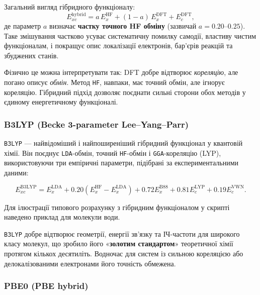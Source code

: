 Загальний вигляд гібридного функціоналу:
\begin{equation}
E_{xc}^{\text{hybrid}} = a\,E_x^{\text{HF}} + (1 - a)\,E_x^{\text{DFT}} + E_c^{\text{DFT}},
\end{equation}
де параметр $a$ визначає \textbf{частку точного HF обміну} (зазвичай $a = 0.20\text{--}0.25$).
Таке змішування частково усуває систематичну помилку самодії, властиву чистим функціоналам, і покращує опис локалізації електронів, бар’єрів реакцій та збуджених станів.

\bigskip
\noindent
Фізично це можна інтерпретувати так:
DFT добре відтворює \emph{кореляцію}, але погано описує \emph{обмін}.
Метод \texttt{HF}, навпаки, має точний обмін, але ігнорує кореляцію.
Гібридний підхід дозволяє поєднати сильні сторони обох методів у єдиному енергетичному функціоналі.

\subsubsection{B3LYP (Becke 3-parameter Lee–Yang–Parr)}

\texttt{B3LYP} — найвідоміший і найпоширеніший гібридний функціонал у квантовій хімії.
Він поєднує \texttt{LDA}-обмін, точний \texttt{HF}-обмін і \texttt{GGA}-кореляцію (LYP), використовуючи три емпіричні параметри, підібрані за експериментальними даними:

\begin{equation}
E_{xc}^{\text{B3LYP}} = E_x^{\text{LDA}} + 0.20(E_x^{\text{HF}} - E_x^{\text{LDA}}) + 0.72E_x^{\text{B88}} + 0.81E_c^{\text{LYP}} + 0.19E_c^{\text{VWN}}.
\end{equation}

Для ілюстрації типового розрахунку з гібридним функціоналом у скрипті  наведено приклад для молекули води.

\texttt{B3LYP} добре відтворює геометрії, енергії зв’язку та ІЧ-частоти для широкого класу молекул, що зробило його «\textbf{золотим стандартом}» теоретичної хімії протягом кількох десятиліть.
Водночас для систем із сильною кореляцією або делокалізованими електронами його точність обмежена.

\subsubsection{PBE0 (PBE hybrid)}

